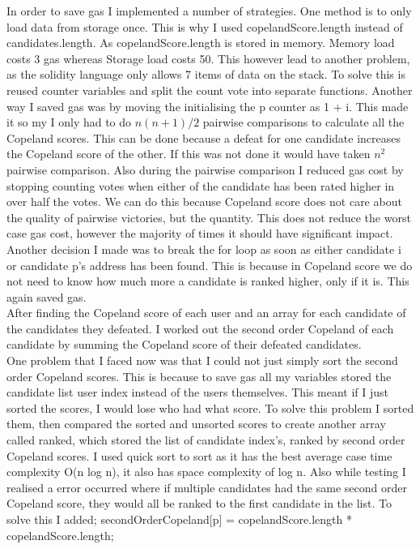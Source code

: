 In order to save gas I implemented a number of strategies. One method is to only load data from storage once. This is why I used copelandScore.length instead of candidates.length. As copelandScore.length is stored in memory. Memory load costs 3 gas whereas Storage load costs 50. This however lead to another problem, as the solidity language only allows 7 items of data on the stack. To solve this is reused counter variables and split the count vote into separate functions.
Another way I saved gas was by moving the initialising the p counter as 1 + i. This made it so my I only had to do $n(n+1)/2$ pairwise comparisons to calculate all the Copeland scores. This can be done because a defeat for one candidate increases the Copeland score of the other. If this was not done it would have taken $n^2$ pairwise comparison. 
Also during the pairwise comparison I reduced gas cost by stopping counting votes when either of the candidate has been rated higher in over half the votes. We can do this because Copeland score does not care about the quality of pairwise victories, but the quantity. This does not reduce the worst case gas cost, however the majority of times it should have significant impact. \\
Another decision I made was to break the for loop as soon as either candidate i or candidate p’s address has been found. This is because in Copeland score we do not need to know how much more a candidate is ranked higher, only if it is. This again saved gas. \\
After finding the Copeland score of each user and an array for each candidate of the candidates they defeated. I worked out the second order Copeland of each candidate by summing the Copeland score of their defeated candidates. \\
One problem that I faced now was that I could not just simply sort the second order Copeland scores. This is because to save gas all my variables stored the candidate list user index instead of the users themselves. This meant if I just sorted the scores, I would lose who had what score. To solve this problem I sorted them, then compared the sorted and unsorted scores to create another array called ranked, which stored the list of candidate index’s, ranked by second order Copeland scores. I used quick sort to sort as it has the best average case time complexity  O(n log n), it also has space complexity of log n. Also while testing I realised a error occurred where if multiple candidates had the same second order Copeland score, they would all be ranked to the first candidate in the list. To solve this I added; secondOrderCopeland[p] = copelandScore.length  * copelandScore.length; \\

